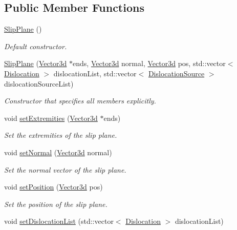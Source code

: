 \subsection*{Public Member Functions}
\begin{DoxyCompactItemize}
\item 
\hyperlink{classSlipPlane_a0d73579f211b7059ee2af1a2816f4eb2}{Slip\-Plane} ()
\begin{DoxyCompactList}\small\item\em Default constructor. \end{DoxyCompactList}\item 
\hyperlink{classSlipPlane_aa1cfea0af8f0a0179490ff8cae715990}{Slip\-Plane} (\hyperlink{classVector3d}{Vector3d} $\ast$ends, \hyperlink{classVector3d}{Vector3d} normal, \hyperlink{classVector3d}{Vector3d} pos, std\-::vector$<$ \hyperlink{classDislocation}{Dislocation} $>$ dislocation\-List, std\-::vector$<$ \hyperlink{classDislocationSource}{Dislocation\-Source} $>$ dislocation\-Source\-List)
\begin{DoxyCompactList}\small\item\em Constructor that specifies all members explicitly. \end{DoxyCompactList}\item 
void \hyperlink{classSlipPlane_aa6b39899a9280d47a3cdef2162dd847c}{set\-Extremities} (\hyperlink{classVector3d}{Vector3d} $\ast$ends)
\begin{DoxyCompactList}\small\item\em Set the extremities of the slip plane. \end{DoxyCompactList}\item 
void \hyperlink{classSlipPlane_ac0d07f48b5a8515bca8f12cb3eb2d264}{set\-Normal} (\hyperlink{classVector3d}{Vector3d} normal)
\begin{DoxyCompactList}\small\item\em Set the normal vector of the slip plane. \end{DoxyCompactList}\item 
void \hyperlink{classSlipPlane_a58ead6125387ef790742374f0a507522}{set\-Position} (\hyperlink{classVector3d}{Vector3d} pos)
\begin{DoxyCompactList}\small\item\em Set the position of the slip plane. \end{DoxyCompactList}\item 
void \hyperlink{classSlipPlane_a3efa3644ca3200d1c84801b3f9eb8ecf}{set\-Dislocation\-List} (std\-::vector$<$ \hyperlink{classDislocation}{Dislocation} $>$ dislocation\-List)

\end{DoxyCompactItemize}
